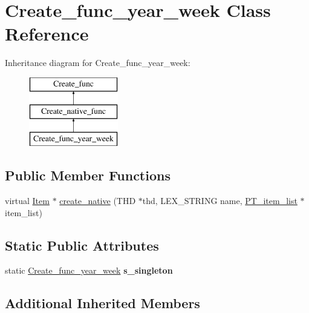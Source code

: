 \hypertarget{classCreate__func__year__week}{}\section{Create\+\_\+func\+\_\+year\+\_\+week Class Reference}
\label{classCreate__func__year__week}
Inheritance diagram for Create\+\_\+func\+\_\+year\+\_\+week\+:\begin{figure}[H]
\begin{center}
\leavevmode
\includegraphics[height=3.000000cm]{classCreate__func__year__week}
\end{center}
\end{figure}
\subsection*{Public Member Functions}
\begin{DoxyCompactItemize}
\item 
virtual \mbox{\hyperlink{classItem}{Item}} $\ast$ \mbox{\hyperlink{classCreate__func__year__week_aa84a28971435f78b2c86aeefc51f2fda}{create\+\_\+native}} (T\+HD $\ast$thd, L\+E\+X\+\_\+\+S\+T\+R\+I\+NG name, \mbox{\hyperlink{classPT__item__list}{P\+T\+\_\+item\+\_\+list}} $\ast$item\+\_\+list)
\end{DoxyCompactItemize}
\subsection*{Static Public Attributes}
\begin{DoxyCompactItemize}
\item 
\mbox{\label{classCreate__func__year__week_a5dc96a5f2a72059956e8f92aed3119d5}} 
static \mbox{\hyperlink{classCreate__func__year__week}{Create\+\_\+func\+\_\+year\+\_\+week}} {\bfseries s\+\_\+singleton}
\end{DoxyCompactItemize}
\subsection*{Additional Inherited Members}


